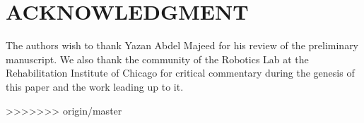 \documentclass[letterpaper, 10 pt, conference]{ieeeconf}  %
\begin{document}
\section*{ACKNOWLEDGMENT}
The authors wish to thank Yazan Abdel Majeed for his review of the preliminary manuscript. We also thank the community  of the Robotics Lab at the Rehabilitation Institute of Chicago for critical commentary during the genesis of this paper and the work leading up to it.

>>>>>>> origin/master


\end{document}
